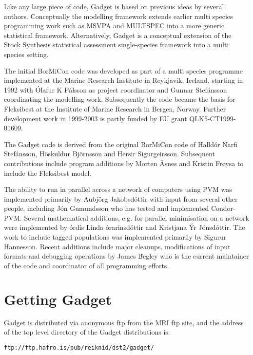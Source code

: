 \documentclass [a4paper, 10pt]{book}
\begin{document}
\bigskip
Like any large piece of code, Gadget is based on previous ideas by several authors.  Conceptually the modelling framework extends earlier multi species programming work such as MSVPA and MULTSPEC into a more generic statistical framework.  Alternatively, Gadget is a conceptual extension of the Stock Synthesis statistical assessment single-species framework into a multi species setting.

\bigskip
The initial BorMiCon code was developed as part of a multi species programme implemented at the Marine Research Institute in Reykjavik, Iceland, starting in 1992 with \'{O}lafur K P\'{a}lsson as project coordinator and Gunnar Stef\'{a}nsson coordinating the modelling work.  Subsequently the code became the basis for Fleksibest at the Institute of Marine Research in Bergen, Norway.  Further development work in 1999-2003 is partly funded by EU grant QLK5-CT1999-01609.

\bigskip
The Gadget code is derived from the original BorMiCon code of Halld\'{o}r Narfi Stef\'{a}nsson, H\"{o}skuldur Bj\"{o}rnsson and Hersir Sigurgeirsson.  Subsequent contributions include program additions by Morten {\AA}snes and Kristin Fr{\o}ysa to include the Fleksibest model.

\bigskip
The ability to run in parallel across a network of computers using PVM was implemented primarily by Au{\dh}bj\"{o}rg Jakobsd\'{o}ttir with input from several other people, including J\'{o}n Gu{\dh}mundsson who has tested and implemented Condor-PVM.  Several mathematical additions, e.g. for parallel minimisation on a network were implemented by {\TH}\'{o}rd\'{i}s Linda {\TH}\'{o}rarinsd\'{o}ttir and Kristjana \'{Y}r J\'{o}nsd\'{o}ttir.  The work to include tagged populations was implemented primarily by Sigur{\dh}ur Hannesson.  Recent additions include major cleanups, modifications of input formats and debugging operations by James Begley who is the current maintainer of the code and coordinator of all programming efforts.

\section{Getting Gadget}\label{sec:gettinggadget}
Gadget is distributed via anonymous ftp from the MRI ftp site, and the address of the top level directory of the Gadget distributions is:

{\small\begin{verbatim}
ftp://ftp.hafro.is/pub/reiknid/dst2/gadget/
\end{verbatim}}
\end{document}
